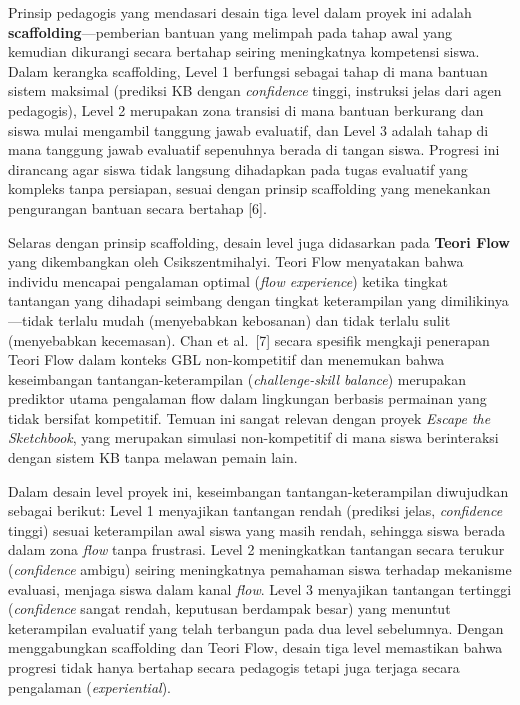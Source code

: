 Prinsip pedagogis yang mendasari desain tiga level dalam proyek ini adalah \textbf{scaffolding}---pemberian bantuan yang melimpah pada tahap awal yang kemudian dikurangi secara bertahap seiring meningkatnya kompetensi siswa. Dalam kerangka scaffolding, Level 1 berfungsi sebagai tahap di mana bantuan sistem maksimal (prediksi KB dengan \textit{confidence} tinggi, instruksi jelas dari agen pedagogis), Level 2 merupakan zona transisi di mana bantuan berkurang dan siswa mulai mengambil tanggung jawab evaluatif, dan Level 3 adalah tahap di mana tanggung jawab evaluatif sepenuhnya berada di tangan siswa. Progresi ini dirancang agar siswa tidak langsung dihadapkan pada tugas evaluatif yang kompleks tanpa persiapan, sesuai dengan prinsip scaffolding yang menekankan pengurangan bantuan secara bertahap [6].

Selaras dengan prinsip scaffolding, desain level juga didasarkan pada \textbf{Teori Flow} yang dikembangkan oleh Csikszentmihalyi. Teori Flow menyatakan bahwa individu mencapai pengalaman optimal (\textit{flow experience}) ketika tingkat tantangan yang dihadapi seimbang dengan tingkat keterampilan yang dimilikinya---tidak terlalu mudah (menyebabkan kebosanan) dan tidak terlalu sulit (menyebabkan kecemasan). Chan et al.\ [7] secara spesifik mengkaji penerapan Teori Flow dalam konteks GBL non-kompetitif dan menemukan bahwa keseimbangan tantangan-keterampilan (\textit{challenge-skill balance}) merupakan prediktor utama pengalaman flow dalam lingkungan berbasis permainan yang tidak bersifat kompetitif. Temuan ini sangat relevan dengan proyek \textit{Escape the Sketchbook}, yang merupakan simulasi non-kompetitif di mana siswa berinteraksi dengan sistem KB tanpa melawan pemain lain.

Dalam desain level proyek ini, keseimbangan tantangan-keterampilan diwujudkan sebagai berikut: Level 1 menyajikan tantangan rendah (prediksi jelas, \textit{confidence} tinggi) sesuai keterampilan awal siswa yang masih rendah, sehingga siswa berada dalam zona \textit{flow} tanpa frustrasi. Level 2 meningkatkan tantangan secara terukur (\textit{confidence} ambigu) seiring meningkatnya pemahaman siswa terhadap mekanisme evaluasi, menjaga siswa dalam kanal \textit{flow}. Level 3 menyajikan tantangan tertinggi (\textit{confidence} sangat rendah, keputusan berdampak besar) yang menuntut keterampilan evaluatif yang telah terbangun pada dua level sebelumnya. Dengan menggabungkan scaffolding dan Teori Flow, desain tiga level memastikan bahwa progresi tidak hanya bertahap secara pedagogis tetapi juga terjaga secara pengalaman (\textit{experiential}).

